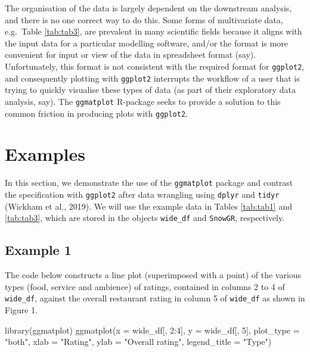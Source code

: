 \documentclass[10pt,a4paper,onecolumn]{article}
\newenvironment{Shaded}{\begin{snugshade}}{\end{snugshade}}
\newcommand{\AttributeTok}[1]{\textcolor[rgb]{0.77,0.63,0.00}{#1}}
\newcommand{\DecValTok}[1]{\textcolor[rgb]{0.00,0.00,0.81}{#1}}
\newcommand{\FunctionTok}[1]{\textcolor[rgb]{0.00,0.00,0.00}{#1}}
\newcommand{\NormalTok}[1]{#1}
\newcommand{\SpecialCharTok}[1]{\textcolor[rgb]{0.00,0.00,0.00}{#1}}
\newcommand{\StringTok}[1]{\textcolor[rgb]{0.31,0.60,0.02}{#1}}
\begin{document}
The organisation of the data is largely dependent on the downstream
analysis, and there is no one correct way to do this. Some forms of
multivariate data, e.g.~Table \ref{tab:tab3}, are prevalent in many
scientific fields because it aligns with the input data for a particular
modelling software, and/or the format is more convenient for input or
view of the data in spreadsheet format (say). Unfortunately, this format
is not consistent with the required format for \texttt{ggplot2}, and
consequently plotting with \texttt{ggplot2} interrupts the workflow of a
user that is trying to quickly visualise these types of data (as part of
their exploratory data analysis, say). The \texttt{ggmatplot} R-package
seeks to provide a solution to this common friction in producing plots
with \texttt{ggplot2}.

\hypertarget{examples}{%
\section{Examples}\label{examples}}

In this section, we demonstrate the use of the \texttt{ggmatplot}
package and contrast the specification with \texttt{ggplot2} after data
wrangling using \texttt{dplyr} and \texttt{tidyr} (Wickham et al.,
2019). We will use the example data in Tables \ref{tab:tab1} and
\ref{tab:tab3}, which are stored in the objects \texttt{wide\_df} and
\texttt{SnowGR}, respectively.

\hypertarget{example-1}{%
\subsection{Example 1}\label{example-1}}

The code below constructs a line plot (superimposed with a point) of the
various types (food, service and ambience) of ratings, contained in
columns 2 to 4 of \texttt{wide\_df}, against the overall restaurant
rating in column 5 of \texttt{wide\_df} as shown in Figure 1.

\begin{Shaded}
\begin{Highlighting}[]
\FunctionTok{library}\NormalTok{(ggmatplot)}
\FunctionTok{ggmatplot}\NormalTok{(}\AttributeTok{x =}\NormalTok{ wide\_df[, }\DecValTok{2}\SpecialCharTok{:}\DecValTok{4}\NormalTok{], }\AttributeTok{y =}\NormalTok{ wide\_df[, }\DecValTok{5}\NormalTok{], }\AttributeTok{plot\_type =} \StringTok{"both"}\NormalTok{,}
          \AttributeTok{xlab =} \StringTok{"Rating"}\NormalTok{,  }\AttributeTok{ylab =} \StringTok{"Overall rating"}\NormalTok{, }\AttributeTok{legend\_title =} \StringTok{"Type"}\NormalTok{) }
\end{Highlighting}
\end{Shaded}
\end{document}
